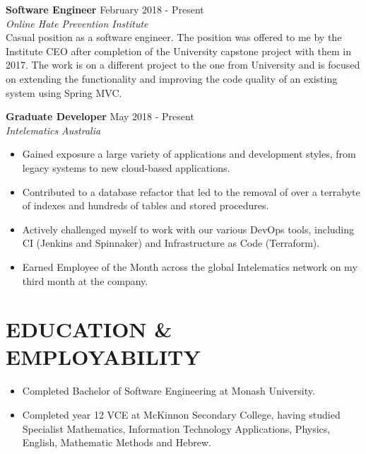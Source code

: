 \documentclass[margin, 10pt]{res} %
\begin{document}
\begin{resume}
\textbf{Software Engineer} \hfill February 2018 - Present \\
{\sl Online Hate Prevention Institute} \\
Casual position as a software engineer. The position was offered to me by the Institute CEO after completion of the University capstone project with them in 2017. The work is on a different project to the one from University and is focused on extending the functionality and improving the code quality of an existing system using Spring MVC.

\textbf{Graduate Developer} \hfill May 2018 - Present \\
{\sl Intelematics Australia} \\
\begin{itemize}
\item Gained exposure a large variety of applications and development styles, from legacy systems to new cloud-based applications.
\item Contributed to a database refactor that led to the removal of over a terrabyte of indexes and hundreds of tables and stored procedures.
\item Actively challenged myself to work with our various DevOps tools, including CI (Jenkins and Spinnaker) and Infrastructure as Code (Terraform).
\item Earned Employee of the Month across the global Intelematics network on my third month at the company.
\end{itemize} 


\section{EDUCATION \& \\ EMPLOYABILITY}

\begin{itemize}
\item Completed Bachelor of Software Engineering at Monash University. %
\item Completed year 12 VCE at McKinnon Secondary College, having studied Specialist  Mathematics, Information Technology Applications, Physics, English, Mathematic Methods and Hebrew.
\end{itemize}


\end{resume}
\end{document}
